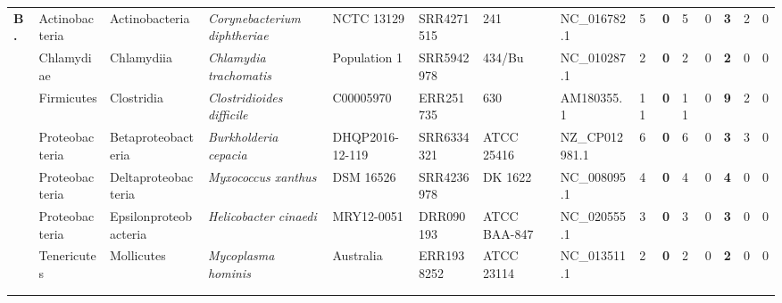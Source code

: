 \begin{sidewaystable}[!hb]
\begin{tabular}{p{.25cm}p{2.05cm}p{2.65cm}p{4.05cm}p{2.55cm}p{1.75cm}p{2.25cm}p{1.95cm}p{.6cm}>{\hfill}p{.4cm}p{.2cm}p{.1cm}>{\hfill}p{.4cm}p{.2cm}p{.1cm}}
    \multirow{7}{*}{\textbf{B.}}& Actinobacteria & Actinobacteria        & \textit{Corynebacterium  diphtheriae} &   NCTC 13129      & SRR4271515 & 241 &  NC\_016782.1      & 5  & \textbf{0} & 5  & 0 & \textbf{3} & 2 & 0 \\
    &Chlamydiae     & Chlamydiia            & \textit{Chlamydia        trachomatis} &  Population 1 & SRR5942978 & 434/Bu & NC\_010287.1     & 2  & \textbf{0} & 2  & 0 & \textbf{2} & 0 & 0 \\
    & Firmicutes     & Clostridia            & \textit{Clostridioides   difficile} &    C00005970                                             & ERR251735  & 630  &AM180355.1       & 11 & \textbf{0} & 11 & 0 & \textbf{9} & 2 & 0 \\
    &Proteobacteria & Betaproteobacteria    & \textit{Burkholderia     cepacia} &      DHQP2016-12-119                                       & SRR6334321 & ATCC 25416       & NZ\_CP012981.1    & 6  & \textbf{0} & 6  & 0 & \textbf{3} & 3 & 0 \\
    &Proteobacteria & Deltaproteobacteria   & \textit{Myxococcus       xanthus} &      DSM 16526                                             & SRR4236978 & DK 1622 & NC\_008095.1
  & 4  & \textbf{0} & 4  & 0 & \textbf{4} & 0 & 0 \\
    &Proteobacteria & Epsilonproteobacteria & \textit{Helicobacter     cinaedi} &      MRY12-0051                                            & DRR090193  & ATCC BAA-847 & NC\_020555.1 & 3  & \textbf{0} & 3  & 0 & \textbf{3} & 0 & 0 \\
    &Tenericutes    & Mollicutes            & \textit{Mycoplasma       hominis} &      Australia                                             & ERR1938252 & ATCC 23114  &NC\_013511.1       & 2  & \textbf{0} & 2  & 0 & \textbf{2} & 0 & 0 \\

    \bottomrule
    \begin{minipage}[t]{.5\textwidth}
      {\tiny
        $\checkmark$  correct assembly; --  unnassembled; $\times$  incorrect assembly\\
      }
    \end{minipage}
  \end{tabular}
\end{sidewaystable}
